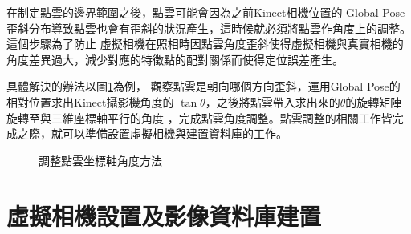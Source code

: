     在制定點雲的邊界範圍之後，點雲可能會因為之前Kinect相機位置的 Global Pose 歪斜分布導致點雲也會有歪斜的狀況產生，這時候就必須將點雲作角度上的調整。這個步驟為了防止
    虛擬相機在照相時因點雲角度歪斜使得虛擬相機與真實相機的角度差異過大，減少對應的特徵點的配對關係而使得定位誤差產生。
    
    具體解決的辦法以圖\ref{fig:rotate axis}為例，
    觀察點雲是朝向哪個方向歪斜，運用Global Pose的相對位置求出Kinect攝影機角度的 $\tan \theta$，之後將點雲帶入求出來的$\theta$的旋轉矩陣旋轉至與三維座標軸平行的角度
    ，完成點雲角度調整。點雲調整的相關工作皆完成之際，就可以準備設置虛擬相機與建置資料庫的工作。

    
    
\begin{figure}
  \begin{center}
  \end{center}
  \caption{調整點雲坐標軸角度方法 }
  \label{fig:rotate axis}
\end{figure}
    
\section{虛擬相機設置及影像資料庫建置}

